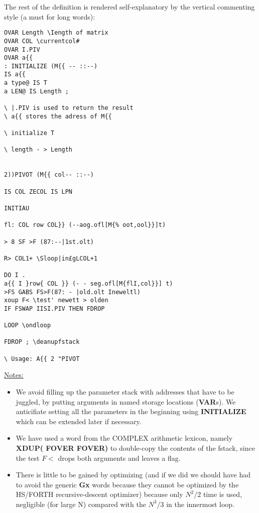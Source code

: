 The rest of the definition is rendered self-explanatory by the 
vertical commenting style (a must for long words):
\begin{verbatim}
OVAR Length \Iength of matrix
OVAR COL \currentcol#
OVAR I.PIV
OVAR a{{
: INITIALIZE (M{{ -- ::--)
IS a{{
a type@ IS T
a LEN@ IS Length ;

\ |.PIV is used to return the result
\ a{{ stores the adress of M{{

\ initialize T

\ length - > Length


2))PIVOT (M{{ col-- ::--)

IS COL ZECOL IS LPN

INITIAU

fl: COL row COL}} (--aog.ofl[M{% oot,ool}}]t)

> 8 SF >F (87:--|1st.olt)

R> COL1+ \Sloop|in£gLCOL+1

DO I .
a{{ I }row{ COL }} (- - seg.ofl[M{flI,col}}] t)
>FS GABS FS>F(87: - |old.olt Ineweltl)
xoup F< \test' newett > olden
IF FSWAP IISI.PIV THEN FDROP

LOOP \ondloop

FDROP ; \deanupfstack

\ Usage: A{{ 2 "PIVOT
\end{verbatim}

\underline{Notes:}

\begin{itemize}
  \item We avoid filling up the parameter stack with addresses that have to be
	  juggled, by putting arguments in named storage locations (\textbf{VAR}s).
		We anticifiate setting all the parameters in the beginning using
		\textbf{INITIALIZE} which can be extended later if necessary.
  \item We have used a word from the COMPLEX arithmetic lexicon, namely
	  \textbf{XDUP( FOVER FOVER)} to double-copy the contents of the fstack,
		since the test $F<$ drops both arguments and leaves a flag.
  \item There is little to be gained by optimizing (and if we did we should
	  have had to avoid the generic \textbf{Gx} words because they cannot be optimized
		by the HS/FORTH recursive-descent optimizer) because only $N^2/2$ time
		is used, negligible (for large N) compared with the $N^3/3$ in the
		innermost loop.
\end{itemize}




